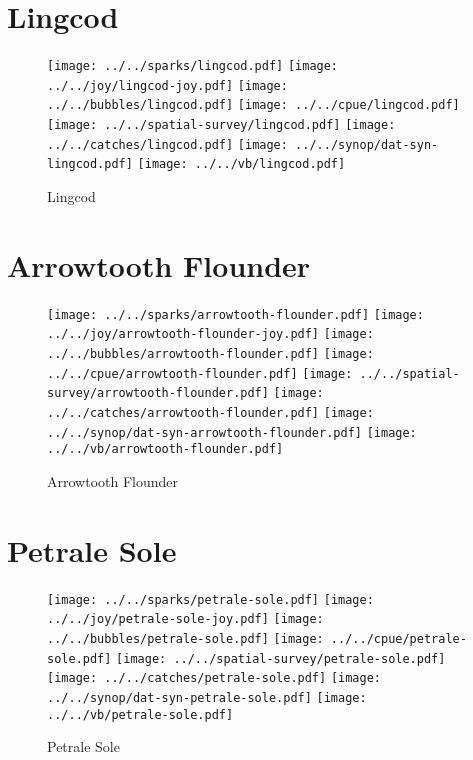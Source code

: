 \section{Lingcod}

\begin{figure}[htbp]
\centering
\texttt{[image: ../../sparks/lingcod.pdf]}
\texttt{[image: ../../joy/lingcod-joy.pdf]}
\texttt{[image: ../../bubbles/lingcod.pdf]}
\texttt{[image: ../../cpue/lingcod.pdf]}
\texttt{[image: ../../spatial-survey/lingcod.pdf]}
\texttt{[image: ../../catches/lingcod.pdf]}
\texttt{[image: ../../synop/dat-syn-lingcod.pdf]}
\texttt{[image: ../../vb/lingcod.pdf]}
\caption{Lingcod}
\end{figure}
\clearpage
\section{Arrowtooth Flounder}

\begin{figure}[htbp]
\centering
\texttt{[image: ../../sparks/arrowtooth-flounder.pdf]}
\texttt{[image: ../../joy/arrowtooth-flounder-joy.pdf]}
\texttt{[image: ../../bubbles/arrowtooth-flounder.pdf]}
\texttt{[image: ../../cpue/arrowtooth-flounder.pdf]}
\texttt{[image: ../../spatial-survey/arrowtooth-flounder.pdf]}
\texttt{[image: ../../catches/arrowtooth-flounder.pdf]}
\texttt{[image: ../../synop/dat-syn-arrowtooth-flounder.pdf]}
\texttt{[image: ../../vb/arrowtooth-flounder.pdf]}
\caption{Arrowtooth Flounder}
\end{figure}
\clearpage
\section{Petrale Sole}

\begin{figure}[htbp]
\centering
\texttt{[image: ../../sparks/petrale-sole.pdf]}
\texttt{[image: ../../joy/petrale-sole-joy.pdf]}
\texttt{[image: ../../bubbles/petrale-sole.pdf]}
\texttt{[image: ../../cpue/petrale-sole.pdf]}
\texttt{[image: ../../spatial-survey/petrale-sole.pdf]}
\texttt{[image: ../../catches/petrale-sole.pdf]}
\texttt{[image: ../../synop/dat-syn-petrale-sole.pdf]}
\texttt{[image: ../../vb/petrale-sole.pdf]}
\caption{Petrale Sole}
\end{figure}
\clearpage
